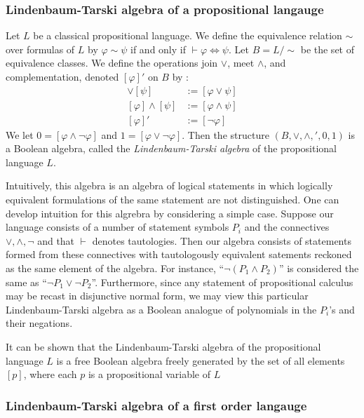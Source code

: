 \documentclass[12pt]{article}
\newcommand{\Or}{\vee}
\newcommand{\Iff}{\Leftrightarrow}
\newcommand{\proves}{\vdash}
\renewcommand{\And}{\wedge}
\begin{document}
\subsubsection*{Lindenbaum-Tarski algebra of a propositional langauge}

Let $L$ be a classical propositional language.  We define the equivalence relation $\sim$ over formulas of $L$ by $\varphi\sim\psi$ if and only if $\proves\varphi\Iff\psi$.  Let $B=L/\sim$ be the set of equivalence classes.  We define the operations join $\vee$, meet $\wedge$, and complementation, denoted $[\varphi]'$ on $B$ by :
\begin{align*}
[\varphi]\vee [\psi]&:=[\varphi\Or\psi]\\
[\varphi]\wedge [\psi]&:=[\varphi\And\psi]\\
[\varphi]'&:=[\neg\varphi]
\end{align*}
We let $0=[\varphi\And\neg\varphi]$ and $1=[\varphi\Or\neg\varphi]$.  Then the structure $(B,\vee,\wedge,',0,1)$ is a Boolean algebra, called the \emph{Lindenbaum-Tarski algebra} of the propositional language $L$.

Intuitively, this algebra is an algebra of logical statements in which logically equivalent formulations of the same statement are not distinguished.  One can develop intuition for this algrebra by considering a simple case.  Suppose our language consists of a number of statement symbols $P_i$ and the connectives $\lor, \land, \neg$ and that $\proves$
denotes tautologies.  Then our algebra consists of statements formed from these connectives with tautologously equivalent satements reckoned as the same element of the algebra.  For instance, ``$\neg (P_1 \land P_2)$'' is
considered the same as ``$\neg P_1 \lor \neg P_2$''.  Furthermore, since any statement of propositional calculus may be recast in disjunctive normal form, we may view this particular Lindenbaum-Tarski algebra as a Boolean analogue of polynomials in the $P_i$'s and their negations.

It can be shown that the Lindenbaum-Tarski algebra of the propositional language $L$ is a free Boolean algebra freely generated by the set of all elements $[p]$, where each $p$ is a propositional variable of $L$

\subsubsection*{Lindenbaum-Tarski algebra of a first order langauge}
\end{document}
